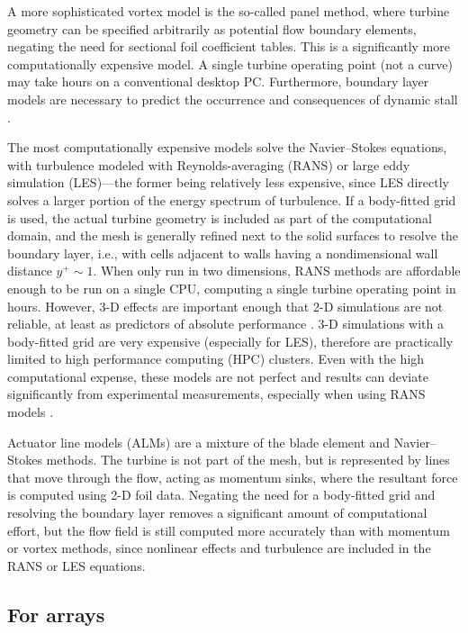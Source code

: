 A more sophisticated vortex model is the so-called panel method, where turbine
geometry can be specified arbitrarily as potential flow boundary elements,
negating the need for sectional foil coefficient tables. This is a significantly
more computationally expensive model. A single turbine operating point (not a
curve) may take hours on a conventional desktop PC. Furthermore, boundary layer
models are necessary to predict the occurrence and consequences of dynamic
stall \cite{Zanon2012}.

The most computationally expensive models solve the Navier--Stokes equations,
with turbulence modeled with Reynolds-averaging (RANS) or large eddy simulation
(LES)---the former being relatively less expensive, since LES directly solves a
larger portion of the energy spectrum of turbulence. If a body-fitted grid is
used, the actual turbine geometry is included as part of the computational
domain, and the mesh is generally refined next to the solid surfaces to resolve
the boundary layer, i.e., with cells adjacent to walls having a nondimensional
wall distance $y^+ \sim 1$. When only run in two dimensions, RANS methods are
affordable enough to be run on a single CPU, computing a single turbine
operating point in hours. However, 3-D effects are important enough that 2-D
simulations are not reliable, at least as predictors of absolute performance
\cite{Li2013}. 3-D simulations with a body-fitted grid are very expensive
(especially for LES), therefore are practically limited to high performance
computing (HPC) clusters. Even with the high computational expense, these models
are not perfect and results can deviate significantly from experimental
measurements, especially when using RANS models \cite{Li2013}.

Actuator line models (ALMs) are a mixture of the blade element and
Navier--Stokes methods. The turbine is not part of the mesh, but is represented
by lines that move through the flow, acting as momentum sinks, where the
resultant force is computed using 2-D foil data. Negating the need for a
body-fitted grid and resolving the boundary layer removes a significant amount
of computational effort, but the flow field is still computed more accurately
than with momentum or vortex methods, since nonlinear effects and turbulence are
included in the RANS or LES equations.


\subsection{For arrays}

